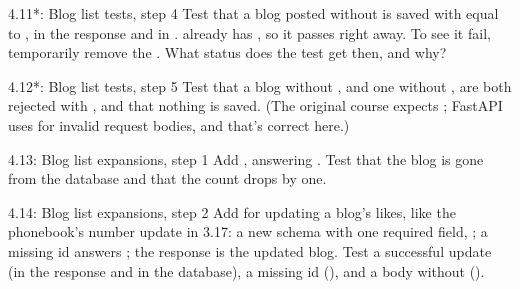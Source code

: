 \begin{exercise}{4.11*: Blog list tests, step 4}
Test that a blog posted without  is saved with  equal to , in the response and in .  already has , so it passes right away. To see it fail, temporarily remove the . What status does the test get then, and why?
\end{exercise}

\begin{exercise}{4.12*: Blog list tests, step 5}
Test that a blog without , and one without , are both rejected with , and that nothing is saved. (The original course expects ; FastAPI uses  for invalid request bodies, and that's correct here.)
\end{exercise}

\begin{exercise}{4.13: Blog list expansions, step 1}
Add , answering . Test that the blog is gone from the database and that the count drops by one.
\end{exercise}

\begin{exercise}{4.14: Blog list expansions, step 2}
Add  for updating a blog's likes, like the phonebook's number update in 3.17: a new schema  with one required field, ; a missing id answers ; the response is the updated blog. Test a successful update (in the response and in the database), a missing id (), and a body without  ().
\end{exercise}
